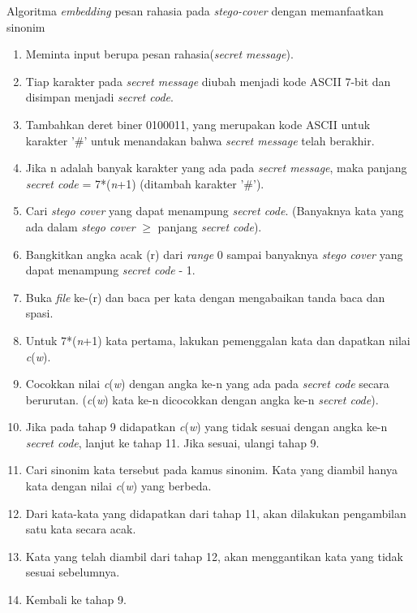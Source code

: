 Algoritma \textit{embedding} pesan rahasia pada \textit{stego-cover} dengan memanfaatkan sinonim

\begin{enumerate}
	\item Meminta input berupa pesan rahasia(\textit{secret message}).
	\item Tiap karakter pada \textit{secret message} diubah menjadi kode ASCII 7-bit dan disimpan menjadi \textit{secret code}.
	\item Tambahkan deret biner 0100011, yang merupakan kode ASCII untuk karakter '\#' untuk menandakan bahwa \textit{secret message} telah berakhir.
	\item Jika n adalah banyak karakter yang ada pada \textit{secret message}, maka panjang \textit{secret code} = 7*(\textit{n}+1) (ditambah karakter '\#').
	\item Cari \textit{stego cover} yang dapat menampung \textit{secret code}. (Banyaknya kata yang ada dalam \textit{stego cover} $\geq$ panjang \textit{secret code}).
	\item Bangkitkan angka acak (r) dari \textit{range} 0 sampai banyaknya \textit{stego cover} yang dapat menampung \textit{secret code} - 1. 
	\item Buka \textit{file} ke-(r) dan baca per kata dengan mengabaikan tanda baca dan spasi.
	\item Untuk 7*(\textit{n}+1) kata pertama, lakukan pemenggalan kata dan dapatkan nilai \textit{c}(\textit{w}).
	\item Cocokkan nilai \textit{c}(\textit{w}) dengan angka ke-n yang ada pada \textit{secret code} secara berurutan. (\textit{c}(\textit{w}) kata ke-n dicocokkan dengan angka ke-n \textit{secret code}).
	\item Jika pada tahap 9 didapatkan \textit{c}(\textit{w}) yang tidak sesuai dengan angka ke-n \textit{secret code}, lanjut ke tahap 11. Jika sesuai, ulangi tahap 9.
	\item Cari sinonim kata tersebut pada kamus sinonim. Kata yang diambil hanya kata dengan nilai \textit{c}(\textit{w}) yang berbeda.
	\item Dari kata-kata yang didapatkan dari tahap 11, akan dilakukan pengambilan satu kata secara acak.
	\item Kata yang telah diambil dari tahap 12, akan menggantikan kata yang tidak sesuai sebelumnya.
	\item Kembali ke tahap 9.
\end{enumerate}

